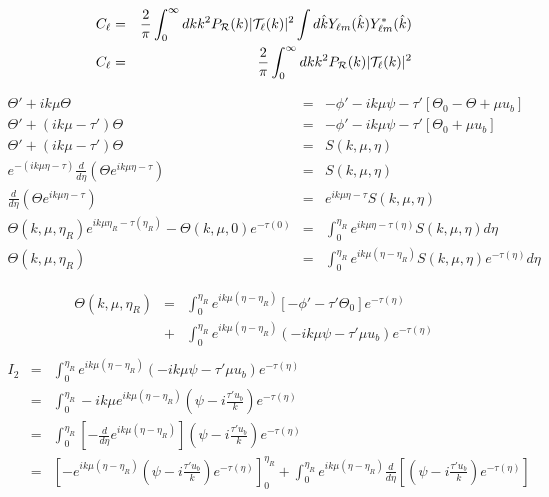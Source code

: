 \documentclass[a4paper, 11pt]{article}
\def\ba{\begin{eqnarray}}
\def\ea{\end{eqnarray}}
\begin{document}
\ba
C_{\ell} &=& \frac{2}{\pi} \int_{0}^{\infty} dk k^{2} P_{\cal R}(k) |{\cal T}_{\ell}(k) |^{2} \int d\hat{k} Y_{\ell m} (\hat{k})  Y^{*}_{\ell m} (\hat{k})  \\
C_{\ell} &=& \frac{2}{\pi} \int_{0}^{\infty} dk k^{2} P_{\cal R}(k) |{\cal T}_{\ell}(k) |^{2}
\ea




\ba
\Theta' + ik \mu \Theta &=& - \phi' - ik\mu\psi - \tau' \left[\Theta_{0} - \Theta + \mu u_{b}  \right] \\
\Theta' + (ik \mu -  \tau') \Theta &=& - \phi' - ik\mu\psi -  \tau' \left[\Theta_{0}  + \mu u_{b}  \right]  \\
\Theta' + (ik \mu - \tau' ) \Theta &=& S(k, \mu, \eta) \\
 e^{-(ik \mu \eta - \tau)}  \frac{d}{d\eta}(\Theta e^{ik \mu \eta - \tau})  &=& S(k, \mu, \eta) \\
 \frac{d}{d\eta}(\Theta e^{ik \mu \eta - \tau})  &=&   e^{ik \mu \eta - \tau}  S(k, \mu, \eta) \\
 \Theta(k, \mu, \eta_{R}) e^{ik \mu \eta_{R} - \tau(\eta_{R})} -   \Theta(k, \mu, 0) e^{- \tau(0)}  &=& \int_{0}^{\eta_{R}} e^{ik \mu \eta - \tau(\eta)} S(k, \mu, \eta) d\eta \\
  \Theta(k, \mu, \eta_{R})&=& \int_{0}^{\eta_{R}} e^{ik \mu (\eta - \eta_{R})} S(k, \mu, \eta) e^{-\tau(\eta)} d\eta  
\ea

\ba
  \Theta(k, \mu, \eta_{R})  &=&  \int_{0}^{\eta_{R}} e^{ik \mu (\eta - \eta_{R}) } [- \phi'  - \tau' \Theta_{0} ] e^{- \tau(\eta)}\\
&+&  \int_{0}^{\eta_{R}} e^{ik \mu (\eta - \eta_{R})}( - ik\mu\psi  -  \tau'\mu u_{b}) e^{- \tau(\eta)} \\
\ea
\ba
I_{2} &=& \int_{0}^{\eta_{R}} e^{ik \mu (\eta - \eta_{R})}( - ik\mu\psi  -  \tau'\mu u_{b}) e^{- \tau(\eta)} \\
         &=& \int_{0}^{\eta_{R}} -ik\mu e^{ik \mu (\eta - \eta_{R}) } \left( \psi  -i  \frac{\tau' u_{b}}{k} \right)  e^{-\tau(\eta)}\\
         &=& \int_{0}^{\eta_{R}} \left[-\frac{d}{d\eta} e^{ik \mu (\eta - \eta_{R})}\right] \left( \psi  -i  \frac{\tau' u_{b}}{k}\right)  e^{- \tau(\eta)} \\
         &=& \left[-e^{ik \mu (\eta - \eta_{R})}( \psi  -i  \frac{\tau' u_{b}}{k})e^{- \tau(\eta)} \right]^{\eta_{R}}_{0} + \int_{0}^{\eta_{R}} e^{ik \mu (\eta - \eta_{R})} \frac{d}{d\eta} \left[\left( \psi  -i  \frac{\tau' u_{b}}{k}\right)  e^{- \tau(\eta)} \right]
\ea
\end{document}
